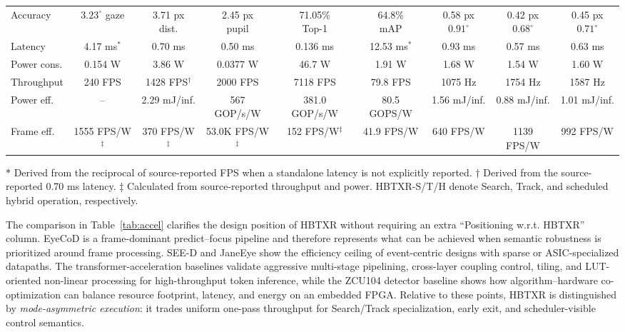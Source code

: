 \documentclass[journal]{IEEEtran}
\begin{document}
\begin{table}[t]
{\begin{tabular}{@{}lcccccccc@{}}
Accuracy & \makecell{$3.23^{\circ}$\\gaze} & \makecell{3.71 px\\dist.} & \makecell{2.45 px\\pupil} & \makecell{71.05\%\\Top-1} & \makecell{64.8\%\\mAP} & \makecell{0.58 px\\$0.91^{\circ}$} & \makecell{0.42 px\\$0.68^{\circ}$} & \makecell{0.45 px\\$0.71^{\circ}$} \\
Latency & 4.17 ms$^\ast$ & 0.70 ms & 0.50 ms & 0.136 ms & 12.53 ms$^\ast$ & 0.93 ms & 0.57 ms & 0.63 ms \\
Power cons. & 0.154 W & 3.86 W & 0.0377 W & 46.7 W & 1.91 W & 1.68 W & 1.54 W & 1.60 W \\
Throughput & 240 FPS & 1428 FPS$^\dagger$ & 2000 FPS & 7118 FPS & 79.8 FPS & 1075 Hz & 1754 Hz & 1587 Hz \\
Power eff. & -- & 2.29 mJ/inf. & 567 GOP/s/W & 381.0 GOP/s/W & 80.5 GOPS/W & 1.56 mJ/inf. & 0.88 mJ/inf. & 1.01 mJ/inf. \\
Frame eff. & 1555 FPS/W$^\ddagger$ & 370 FPS/W$^\ddagger$ & 53.0K FPS/W$^\ddagger$ & 152 FPS/W$^\ddagger$ & 41.9 FPS/W & 640 FPS/W & 1139 FPS/W & 992 FPS/W \\
\bottomrule
\end{tabular}}
\vspace{1mm}
\parbox{\textwidth}{\footnotesize $\ast$ Derived from the reciprocal of source-reported FPS when a standalone latency is not explicitly reported. $\dagger$ Derived from the source-reported 0.70 ms latency. $\ddagger$ Calculated from source-reported throughput and power. HBTXR-S/T/H denote Search, Track, and scheduled hybrid operation, respectively.}
\end{table}

The comparison in Table~\ref{tab:accel} clarifies the design position of HBTXR without requiring an extra ``Positioning w.r.t. HBTXR'' column. EyeCoD is a frame-dominant predict--focus pipeline and therefore represents what can be achieved when semantic robustness is prioritized around frame processing. SEE-D and JaneEye show the efficiency ceiling of event-centric designs with sparse or ASIC-specialized datapaths. The transformer-acceleration baselines validate aggressive multi-stage pipelining, cross-layer coupling control, tiling, and LUT-oriented non-linear processing for high-throughput token inference, while the ZCU104 detector baseline shows how algorithm--hardware co-optimization can balance resource footprint, latency, and energy on an embedded FPGA. Relative to these points, HBTXR is distinguished by \emph{mode-asymmetric execution}: it trades uniform one-pass throughput for Search/Track specialization, early exit, and scheduler-visible control semantics.
\end{document}
